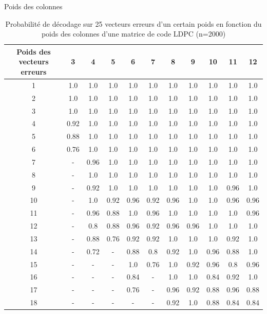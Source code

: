 \documentclass[french,nochapter,11pt]{rapportUB}
\begin{document}
\begin{table}[htbp]
  \centering
  \caption{Probabilité de décodage sur 25 vecteurs erreurs d'un certain poids en fonction du poids des colonnes d'une matrice de code LDPC (n=2000)}
  \label{table:res3}
  \vspace{0.1cm}\hspace{4.5cm} Poids des colonnes\vspace{0.1cm}
  \begin{tabular}{|c|c|c|c|c|c|c|c|c|c|c|}
    \hline
    Poids des vecteurs erreurs &3 &4 &5 &6 &7 &8 &9 &10 &11 &12\\
    \hline
    1	&1.0	&1.0	&1.0	&1.0	&1.0	&1.0	&1.0	&1.0	&1.0 &1.0\\
    \hline
    2	&1.0	&1.0	&1.0	&1.0	&1.0	&1.0	&1.0	&1.0	&1.0 &1.0\\
    \hline
    3	&1.0	&1.0	&1.0	&1.0	&1.0	&1.0	&1.0	&1.0	&1.0 &1.0\\
    \hline
    4	&0.92	&1.0	&1.0	&1.0	&1.0	&1.0	&1.0	&1.0	&1.0 &1.0\\
    \hline
    5	&0.88	&1.0	&1.0	&1.0	&1.0	&1.0	&1.0	&1.0	&1.0 &1.0\\
    \hline
    6	&0.76	&1.0	&1.0	&1.0	&1.0	&1.0	&1.0	&1.0	&1.0 &1.0 \\
    \hline
    7	&-	&0.96	&1.0	&1.0	&1.0	&1.0	&1.0	&1.0	&1.0	&1.0 \\
    \hline
    8	&-	&1.0	&1.0	&1.0	&1.0	&1.0	&1.0	&1.0	&1.0	&1.0 \\
    \hline
    9	&-	&0.92	&1.0	&1.0	&1.0	&1.0	&1.0	&1.0	&0.96	&1.0 \\
    \hline
    10	&-	&1.0	&0.92	&0.96	&0.92	&0.96	&1.0	&1.0	&0.96	&0.96 \\
    \hline
    11	&-	&0.96	&0.88	&1.0	&0.96	&1.0	&1.0	&1.0	&1.0	&0.96 \\
    \hline
    12	&-	&0.8	&0.88	&0.96	&0.92	&0.96	&0.96	&1.0	&1.0	&1.0 \\
    \hline
    13	&-	&0.88	&0.76	&0.92	&0.92	&1.0	&1.0	&1.0	&0.92	&1.0 \\
    \hline
    14	&-	&0.72	&-	&0.88	&0.8	&0.92	&1.0	&0.96	&0.88	&1.0 \\
    \hline
    15	&-	&-	&-	&1.0	&0.76	&1.0	&0.92	&0.96	&0.8	&0.96 \\
    \hline 
    16	&-	&-	&-	&0.84	&-	&1.0	&1.0	&0.84	&0.92	&1.0 \\
    \hline
    17	&-	&-	&-	&0.76	&-	&0.96	&0.92	&0.88	&0.96	&0.88 \\
    \hline 
    18	&-	&-	&-	&-	&-	&0.92	&1.0	&0.88	&0.84	&0.84 \\

\end{tabular}
\end{table}
\end{document}

